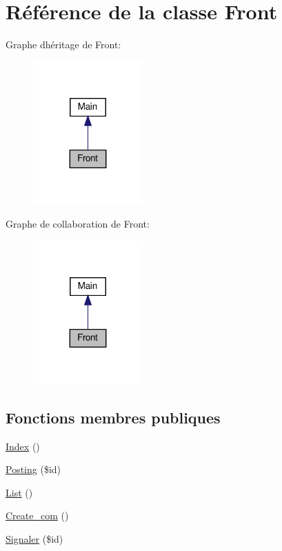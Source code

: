 \hypertarget{class_src_1_1_controllers_1_1_front}{}\section{Référence de la classe Front}
\label{class_src_1_1_controllers_1_1_front}


Graphe d\textquotesingle{}héritage de Front\+:
\nopagebreak
\begin{figure}[H]
\begin{center}
\leavevmode
\includegraphics[width=119pt]{d6/db7/class_src_1_1_controllers_1_1_front__inherit__graph}
\end{center}
\end{figure}


Graphe de collaboration de Front\+:
\nopagebreak
\begin{figure}[H]
\begin{center}
\leavevmode
\includegraphics[width=119pt]{d8/d00/class_src_1_1_controllers_1_1_front__coll__graph}
\end{center}
\end{figure}
\subsection*{Fonctions membres publiques}
\begin{DoxyCompactItemize}
\item 
\hyperlink{class_src_1_1_controllers_1_1_front_ac36db983080e1b0934908febca5de2d9}{Index} ()
\item 
\hyperlink{class_src_1_1_controllers_1_1_front_a5fcbe325afb03acc6e4eaec38a7bb1ae}{Posting} (\$id)
\item 
\hyperlink{class_src_1_1_controllers_1_1_front_a17e6c90f14225bdac5c65ed915b0a2f6}{List} ()
\item 
\hyperlink{class_src_1_1_controllers_1_1_front_aff5b608669ee776cd4c341238adddb7c}{Create\+\_\+com} ()
\item 
\hyperlink{class_src_1_1_controllers_1_1_front_a8b22c40bd1737bbb7db0816b7e9763b3}{Signaler} (\$id)
\end{DoxyCompactItemize}
